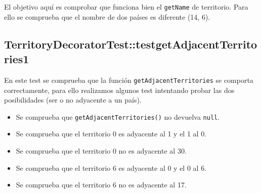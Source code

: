 El objetivo aquí es comprobar que funciona bien el \texttt{getName} de territorio. Para ello se comprueba que el nombre de dos países es diferente (14, 6).

\subsection{TerritoryDecoratorTest::testgetAdjacentTerritories1}

En este test se comprueba que la función \texttt{getAdjacentTerritories} se comporta correctamente, para ello realizamos algunos test intentando probar las dos posibilidades (ser o no adyacente a un país). 

\begin{itemize} 

\item Se comprueba que \texttt{getAdjacentTerritories()} no devuelva \texttt{null}.

\item Se comprueba que el territorio 0 es adyacente al 1 y el 1 al 0.
	
\item Se comprueba que el territorio 0 no es adyacente al 30.
	
\item Se comprueba que el territorio 6  es adyacente al 0 y el 0 al 6.
	
\item Se comprueba que el territorio 6 no es adyacente al 17.	

\end{itemize}
